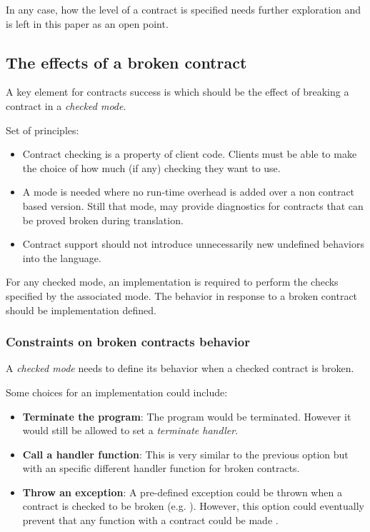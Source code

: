 In any case, how the level of a contract is specified needs further exploration 
and is left in this paper as an open point.

\subsection{The effects of a broken contract}

A key element for contracts success is which should be the effect of breaking a
contract in a \emph{checked mode}. 

Set of principles:

\begin{itemize}

\item Contract checking is a property of client code. Clients must be able to
make the choice of how much (if any) checking they want to use.

\item A mode is needed where no run-time overhead is added over a non contract
based version. Still that mode, may provide diagnostics for contracts that can
be proved broken during translation.

\item Contract support should not introduce unnecessarily new undefined behaviors
into the language.

\end{itemize}
 
For any checked mode, an implementation is required to perform the
checks specified by the associated mode. The behavior in response to a broken
contract should be implementation defined.

\subsubsection{Constraints on broken contracts behavior}

A \emph{checked mode} needs to define its behavior when a checked
contract is broken.

Some choices for an implementation could include:

\begin{itemize}

\item \textbf{Terminate the program}: The program would be terminated. However
it would still be allowed to set a \emph{terminate handler}.

\item \textbf{Call a handler function}: This is very similar to the previous
option but with an specific different handler function for broken contracts.

\item \textbf{Throw an exception}: A pre-defined exception could be thrown when
a contract is checked to be broken (e.g. ). However,
this option could eventually prevent that any function with a contract could be
made .

\end{itemize}

